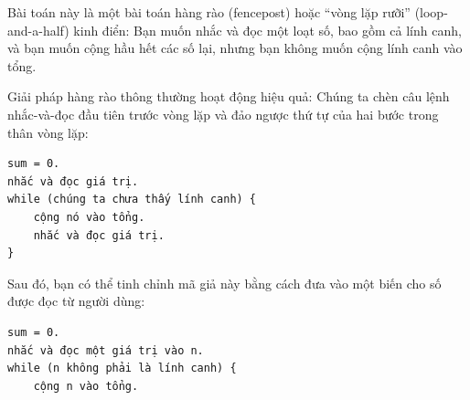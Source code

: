 Bài toán này là một bài toán hàng rào (fencepost) hoặc ``vòng lặp rưỡi'' (loop-and-a-half) kinh điển: Bạn muốn nhắc và đọc một loạt số, bao gồm cả lính canh, và bạn muốn cộng hầu hết các số lại, nhưng bạn không muốn cộng lính canh vào tổng.

Giải pháp hàng rào thông thường hoạt động hiệu quả: Chúng ta chèn câu lệnh nhắc-và-đọc đầu tiên trước vòng lặp và đảo ngược thứ tự của hai bước trong thân vòng lặp:

\begin{verbatim}
sum = 0.
nhắc và đọc giá trị.
while (chúng ta chưa thấy lính canh) {
    cộng nó vào tổng.
    nhắc và đọc giá trị.
}
\end{verbatim}


Sau đó, bạn có thể tinh chỉnh mã giả này bằng cách đưa vào một biến cho số được đọc từ người dùng:

\begin{verbatim}
sum = 0.
nhắc và đọc một giá trị vào n.
while (n không phải là lính canh) {
    cộng n vào tổng.
\end{verbatim}

